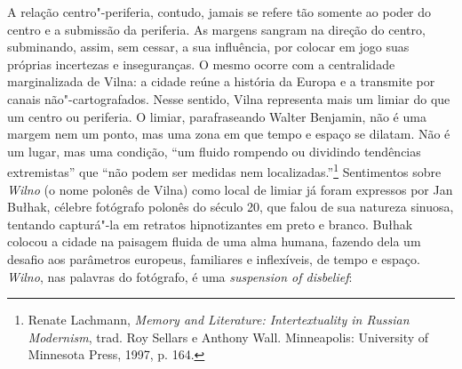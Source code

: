 A relação centro"-periferia, contudo, jamais se refere tão somente ao
poder do centro e a submissão da periferia. As margens sangram na
direção do centro, subminando, assim, sem cessar, a sua influência, por
colocar em jogo suas próprias incertezas e inseguranças. O mesmo ocorre
com a centralidade marginalizada de Vilna: a cidade reúne a história da
Europa e a transmite por canais não"-cartografados. Nesse sentido, Vilna
representa mais um limiar do que um centro ou periferia. O limiar,
parafraseando Walter Benjamin, não é uma margem nem um ponto, mas uma
zona em que tempo e espaço se dilatam. Não é um lugar, mas uma condição,
``um fluido rompendo ou dividindo tendências extremistas'' que ``não
podem ser medidas nem localizadas.''\footnote{Renate Lachmann, \textit{Memory and Literature: Intertextuality in Russian Modernism}, trad. Roy Sellars e Anthony Wall. Minneapolis: University of Minnesota Press, 1997, p. 164.} Sentimentos sobre \textit{Wilno} (o nome polonês de Vilna) como local de limiar já foram expressos por Jan Bułhak,
célebre fotógrafo polonês do século 20, que falou de sua natureza
sinuosa, tentando capturá"-la em retratos hipnotizantes em preto e
branco. Bułhak colocou a cidade na paisagem fluida de uma alma humana,
fazendo dela um desafio aos parâmetros europeus, familiares e
inflexíveis, de tempo e espaço. \textit{Wilno}, nas palavras do fotógrafo, é uma
\textit{suspension of disbelief}:



